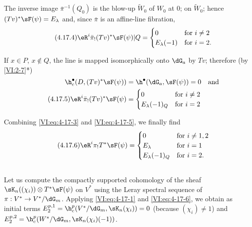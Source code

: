 The inverse image $\bar\pi^{-1}(Q_0)$ is the blow-up $\widetilde W_0$ of 
$W_0$ at $0$;  on $\widetilde W_0$; hence 
$(T v)^\ast \sF(\psi)=E_\lambda$  and, since $\bar\pi$ is an 
affine-line fibration, 
\begin{equation*}\tag{4.17.4}\label{VI:eq:4-17-4}
  \eR^i \bar\pi_! (T v)^\ast \sF(\psi)|Q = 
    \begin{cases}
      0 & \text{for $i\ne 2$} \\
      E_\lambda(-1) & \text{for $i=2$.} 
    \end{cases} 
\end{equation*}

If $x\in P$, $x\notin Q$, the line  is mapped 
isomorphically onto $\dG_a$ by $T v$; therefore (by 
\ref{VI:2-7}*) 
\begin{align} \notag 
  \h_c^\bullet(D,(T v)^\ast \sF(\psi)) &= \h^\bullet(\dG_a,\sF(\psi)) = 0 && \text{and} \\
  \tag{4.17.5}\label{VI:eq:4-17-5}
  \eR^i \bar\pi_! (T v)^\ast \sF(\psi) 
    &= \begin{cases} 
         0 & \text{for $i\ne 2$} \\
         E_\lambda(-1)_Q & \text{for $i=2$} 
       \end{cases} 
\end{align}

Combining \eqref{VI:eq:4-17-3} and \eqref{VI:eq:4-17-5}, we finally find 
\begin{equation*}\tag{4.17.6}\label{VI:eq:4-17-6}
  \eR^i \pi_! T^\ast\sF(\psi) = 
    \begin{cases}
      0 & \text{for $i\ne 1,2$} \\
      E_\lambda & \text{for $i=1$} \\
      E_\lambda(-1)_Q & \text{for $i=2$.} 
    \end{cases}
\end{equation*}





\subsection{}\label{VI:4-18}

Let us compute the compactly supported cohomology of the sheaf 
$\sK_n((\chi_i))\otimes T^\ast \sF(\psi)$ on $V^\ast$ using the 
Leray spectral sequence of $\pi:V^\ast\to V^\ast/\dG_m$. Applying 
\eqref{VI:eq:4-17-1} and \eqref{VI:eq:4-17-6}, we obtain as initial terms 
$E_2^{p,1} = \h_c^p(V^\ast/\dG_m,\sK_n(\chi_i)) = 0$ (because $(\chi_i)\ne 1$) 
and $E_2^{p,2} = \h_c^p(W^\ast/\dG_m,\sK_n(\chi_i)(-1))$. 

